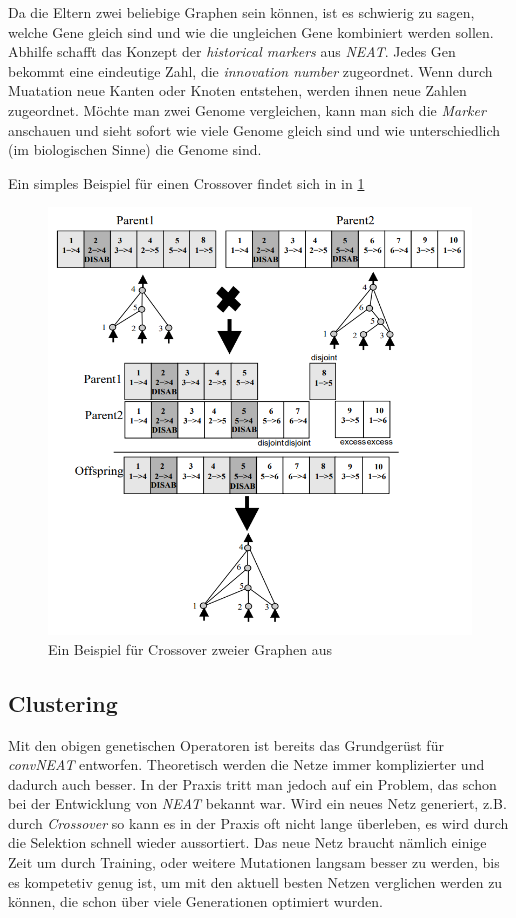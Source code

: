 \documentclass[]{scrartcl}
\begin{document}
			Da die Eltern zwei beliebige Graphen sein können, ist es schwierig zu sagen, welche Gene gleich sind und wie die ungleichen Gene kombiniert werden sollen.
			Abhilfe schafft das Konzept der \textit{historical markers} aus \textit{NEAT}. Jedes Gen bekommt eine eindeutige Zahl, die \textit{innovation number} zugeordnet.
			Wenn durch Muatation neue Kanten oder Knoten entstehen, werden ihnen neue Zahlen zugeordnet.
			Möchte man zwei Genome vergleichen, kann man sich die \textit{Marker} anschauen und sieht sofort wie viele Genome gleich sind und wie
			unterschiedlich (im biologischen Sinne) die Genome sind.

			Ein simples Beispiel für einen Crossover findet sich in in \ref{fig:crossover}

			\begin{figure}[h]
				\centering
				\includegraphics[scale=0.6]{img/crossover.png}
				\caption{Ein Beispiel für Crossover zweier Graphen aus \cite{neat}}
				\label{fig:crossover}
			\end{figure}

		\subsection{Clustering}

			Mit den obigen genetischen Operatoren ist bereits das Grundgerüst für \textit{convNEAT} entworfen.
			Theoretisch werden die Netze immer komplizierter und dadurch auch besser.
			In der Praxis tritt man jedoch auf ein Problem, das schon bei der Entwicklung von \textit{NEAT} bekannt war.
			Wird ein neues Netz generiert, z.B. durch \textit{Crossover} so kann es in der Praxis oft nicht lange überleben, es wird durch die Selektion
			schnell wieder aussortiert. Das neue Netz braucht nämlich einige Zeit um durch Training, oder weitere Mutationen langsam besser zu werden, bis es
			kompetetiv genug ist, um mit den aktuell besten Netzen verglichen werden zu können, die schon über viele Generationen optimiert wurden.
\end{document}
